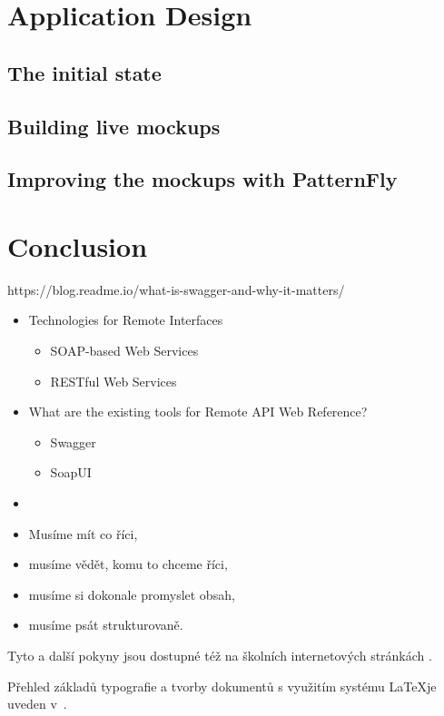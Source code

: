\chapter{Application Design}
\label{design}
\section{The initial state}
\section{Building live mockups}
\section{Improving the mockups with PatternFly}

\chapter{Conclusion}
https://blog.readme.io/what-is-swagger-and-why-it-matters/

\begin{itemize}
  \item Technologies for Remote Interfaces
  \begin{itemize}
    \item SOAP-based Web Services
    \item RESTful Web Services
  \end{itemize}
  \item What are the existing tools for Remote API Web Reference?
  \begin{itemize}
    \item Swagger
    \item SoapUI
  \end{itemize}
  \item 
\end{itemize}

\begin{itemize}
\item Musíme mít co říci,
\item musíme vědět, komu to chceme říci,
\item musíme si dokonale promyslet obsah,
\item musíme psát strukturovaně. 
\end{itemize}

Tyto a další pokyny jsou dostupné též na školních internetových stránkách \cite{fitWeb}.

Přehled základů typografie a tvorby dokumentů s využitím systému \LaTeX je 
uveden v~\cite{Rybicka}.

